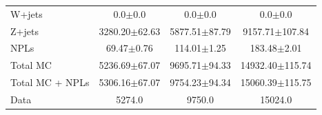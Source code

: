 \begin{table}[hp]
\begin{tabular}{l S[table-align-uncertainty=true] S[table-align-uncertainty=true] S[table-align-uncertainty=true]}
W+jets & 0.0$\pm$0.0 & 0.0$\pm$0.0 & 0.0$\pm$0.0    \\
Z+jets & 3280.20$\pm$62.63 & 5877.51$\pm$87.79 & 9157.71$\pm$107.84    \\
\hline
NPLs & 69.47$\pm$0.76 & 114.01$\pm$1.25 & 183.48$\pm$2.01   \\
\hline
Total MC & 5236.69$\pm$67.07 & 9695.71$\pm$94.33 & 14932.40$\pm$115.74    \\
Total MC + NPLs & 5306.16$\pm$67.07 & 9754.23$\pm$94.34 & 15060.39$\pm$115.75    \\
\hline
Data & 5274.0 & 9750.0 & 15024.0    \\
\hline
\end{tabular}
\end{table}


